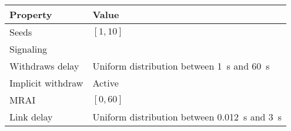 \begin{center}
	\begin{tabular}{ || m{4cm}| m{8cm} || } 
	\hline
	Property & Value \\ 
	\hline \hline
	Seeds & $[1, 10]$ \\ 
	\hline
	Signaling & \q{AW} \\
	\hline
		Withdraws delay & Uniform distribution between \SI{1}{\second} and \SI{60}{\second} \\ 
	\hline
	Implicit withdraw & Active \\ 
	\hline
		MRAI & $[0, 60]$ \\
	\hline
	Link delay & Uniform distribution between \SI{0.012}{\second} and \SI{3}{\second} \\
	\hline
	\end{tabular}
\end{center}
